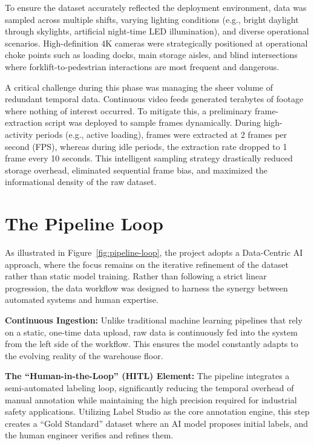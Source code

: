 To ensure the dataset accurately reflected the deployment environment, data was sampled across multiple shifts, varying lighting conditions (e.g., bright daylight through skylights, artificial night-time LED illumination), and diverse operational scenarios. High-definition 4K cameras were strategically positioned at operational choke points such as loading docks, main storage aisles, and blind intersections where forklift-to-pedestrian interactions are most frequent and dangerous. 

A critical challenge during this phase was managing the sheer volume of redundant temporal data. Continuous video feeds generated terabytes of footage where nothing of interest occurred. To mitigate this, a preliminary frame-extraction script was deployed to sample frames dynamically. During high-activity periods (e.g., active loading), frames were extracted at 2 frames per second (FPS), whereas during idle periods, the extraction rate dropped to 1 frame every 10 seconds. This intelligent sampling strategy drastically reduced storage overhead, eliminated sequential frame bias, and maximized the informational density of the raw dataset.

\section{The Pipeline Loop}
As illustrated in Figure~\ref{fig:pipeline-loop}, the project adopts a Data-Centric AI approach, where the focus remains on the iterative refinement of the dataset rather than static model training. Rather than following a strict linear progression, the data workflow was designed to harness the synergy between automated systems and human expertise.

\textbf{Continuous Ingestion:} Unlike traditional machine learning pipelines that rely on a static, one-time data upload, raw data is continuously fed into the system from the left side of the workflow. This ensures the model constantly adapts to the evolving reality of the warehouse floor.

\textbf{The ``Human-in-the-Loop'' (HITL) Element:} The pipeline integrates a semi-automated labeling loop, significantly reducing the temporal overhead of manual annotation while maintaining the high precision required for industrial safety applications. Utilizing Label Studio as the core annotation engine, this step creates a ``Gold Standard'' dataset where an AI model proposes initial labels, and the human engineer verifies and refines them.

